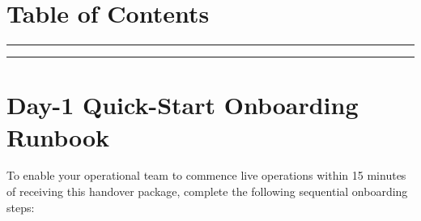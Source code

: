 \documentclass[11pt,a4paper]{article}
\begin{document}
\newpage

\section*{Table of Contents}
\vspace{0.2cm}
\rule{\textwidth}{0.5pt}
\vspace{0.2cm}

{
  \hypersetup{linkcolor=monoBlack}
  \renewcommand{\contentsname}{}
  \tableofcontents
}

\vspace{0.6cm}
\rule{\textwidth}{0.5pt}

\newpage
{}

\section{Day-1 Quick-Start Onboarding Runbook}

To enable your operational team to commence live operations within 15 minutes of receiving this handover package, complete the following sequential onboarding steps:
\end{document}

